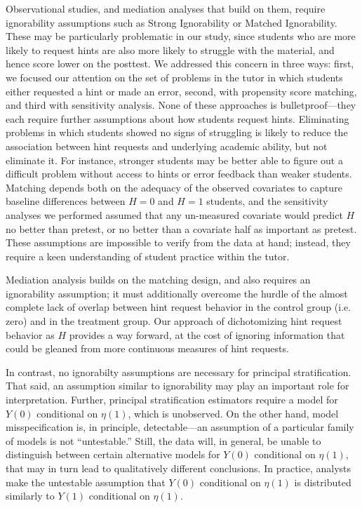 \documentclass{article}\usepackage[]{graphicx}\usepackage[]{color}
\begin{document}
Observational studies, and mediation analyses that build on them,
require ignorability assumptions such as Strong Ignorability or
Matched Ignorability.
These may be particularly problematic in our study, since students who
are more likely to request hints are also more likely to struggle with
the material, and hence score lower on the posttest.
We addressed this concern in three ways: first, we focused our attention
on the set of problems in the tutor in which students either requested
a hint or made an error, second, with propensity score matching, and
third with sensitivity analysis.
None of these approaches is bulletproof---they each require further
assumptions about how students request hints.
Eliminating problems in which students showed no signs of struggling
is likely to reduce the association between hint requests and
underlying academic ability, but not eliminate it.
For instance, stronger students may be better able to figure out a
difficult problem without access to hints or error feedback than
weaker students.
Matching depends both on the adequacy of the observed covariates to
capture baseline differences between $H=0$ and $H=1$ students, and the
sensitivity analyses we performed assumed that any un-measured
covariate would predict $H$ no better than pretest, or no better than
a covariate half as important as pretest.
These assumptions are impossible to verify from the data at hand;
instead, they require a keen understanding of student practice within
the tutor.

Mediation analysis builds on the matching design, and also requires an
ignorability assumption; it must
additionally overcome the hurdle of the almost complete lack of
overlap between hint request behavior in the control group (i.e. zero)
and in the treatment group.
Our approach of dichotomizing hint request behavior as $H$ provides a
way forward, at the cost of ignoring information that could be gleaned
from more continuous measures of hint requests.

In contrast, no ignorabilty assumptions are necessary for principal
stratification.
That said, an assumption similar to ignorability may play an important
role for interpretation.
Further, principal stratification estimators require a model for $Y(0)$
conditional on $\eta(1)$, which is unobserved.
On the other hand, model misspecification is, in principle,
detectable---an assumption of a particular family of models is not
``untestable.''
Still, the data will, in general, be unable to distinguish between certain
alternative models for $Y(0)$ conditional on $\eta(1)$, that may in
turn lead to qualitatively different conclusions.
In practice, analysts make the untestable assumption that $Y(0)$ conditional on $\eta(1)$ is
distributed similarly to $Y(1)$ conditional on $\eta(1)$.
\end{document}
